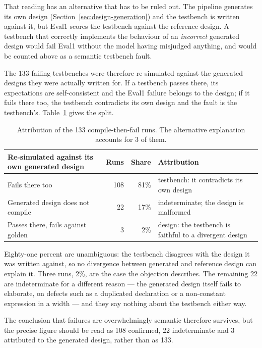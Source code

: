 \documentclass[11pt,a4paper,titlepage=false]{scrreprt}
\begin{document}
That reading has an alternative that has to be ruled out. The pipeline generates its own
design (Section~\ref{sec:design-generation}) and the testbench is written against it, but
Eval1 scores the testbench against the reference design. A testbench that correctly
implements the behaviour of an \emph{incorrect} generated design would fail Eval1 without the
model having misjudged anything, and would be counted above as a semantic testbench fault.

The 133 failing testbenches were therefore re-simulated against the generated designs they
were actually written for. If a testbench passes there, its expectations are self-consistent
and the Eval1 failure belongs to the design; if it fails there too, the testbench contradicts
its own design and the fault is the testbench's. Table~\ref{tab:dut-attrib} gives the split.

\begin{table}[H]
\centering
\small
\begin{tabular}{@{}p{5.0cm} r r p{4.6cm}@{}}
\toprule
\textbf{Re-simulated against its own generated design} & \textbf{Runs} & \textbf{Share} & \textbf{Attribution} \\
\midrule
Fails there too & 108 & 81\% & testbench: it contradicts its own design \\
Generated design does not compile & 22 & 17\% & indeterminate; the design is malformed \\
Passes there, fails against golden & 3 & 2\% & design: the testbench is faithful to a divergent design \\
\bottomrule
\end{tabular}
\caption{Attribution of the 133 compile-then-fail runs. The alternative explanation accounts
for 3 of them.}
\label{tab:dut-attrib}
\end{table}

Eighty-one percent are unambiguous: the testbench disagrees with the design it was written
against, so no divergence between generated and reference design can explain it. Three runs,
2\%, are the case the objection describes. The remaining 22 are indeterminate for a different
reason --- the generated design itself fails to elaborate, on defects such as a duplicated
declaration or a non-constant expression in a width --- and they say nothing about the
testbench either way.

The conclusion that failures are overwhelmingly semantic therefore survives, but the precise
figure should be read as 108 confirmed, 22 indeterminate and 3 attributed to the
generated design, rather than as 133.
\end{document}
